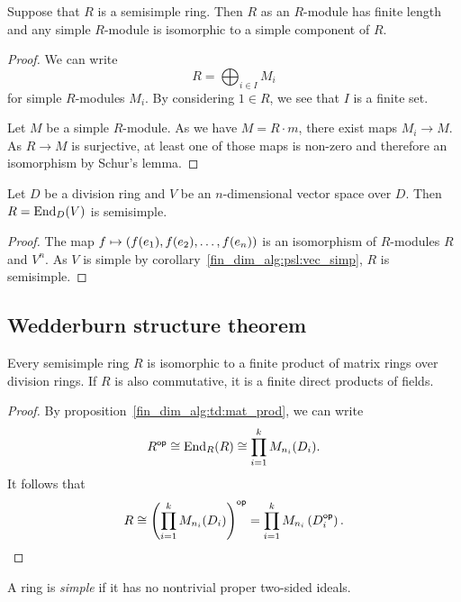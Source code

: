 \begin{posledica}
Suppose that $R$ is a semisimple ring. Then $R$ as an $R$-module
has finite length and any simple $R$-module is isomorphic to a
simple component of $R$.
\end{posledica}

\begin{proof}
We can write
\[
R = \bigoplus_{i \in I} M_i
\]
for simple $R$-modules $M_i$. By considering $1 \in R$, we see that
$I$ is a finite set.

Let $M$ be a simple $R$-module. As we have $M = R \cdot m$, there
exist maps $M_i \to M$. As $R \to M$ is surjective, at least one
of those maps is non-zero and therefore an isomorphism by Schur's
lemma.
\end{proof}

\begin{trditev}
Let $D$ be a division ring and $V$ be an $n$-dimensional vector
space over $D$. Then $R = \operatorname{End}_D(V)$ is semisimple.
\end{trditev}

\begin{proof}
The map $f \mapsto \left(f(e_1), f(e_2), \dots, f(e_n)\right)$ is an
isomorphism of $R$-modules $R$ and $V^n$. As $V$ is simple by
corollary~\ref{fin_dim_alg:psl:vec_simp}, $R$ is semisimple.
\end{proof}

\newpage

\subsection{Wedderburn structure theorem}

\begin{izrek}[Wedderburn]
Every semisimple ring $R$ is isomorphic to a finite product of
matrix rings over division rings. If $R$ is also commutative, it is
a finite direct products of fields.
\end{izrek}

\begin{proof}
By proposition~\ref{fin_dim_alg:td:mat_prod}, we can write
\[
R^{\mathsf{op}} \cong \operatorname{End}_R(R) \cong \prod_{i=1}^k M_{n_i}(D_i).
\]
It follows that
\[
R \cong
\left(\prod_{i=1}^k M_{n_i}(D_i)\right)^{\mathsf{op}} =
\prod_{i=1}^k M_{n_i} \left(D_i^{\mathsf{op}}\right). \qedhere
\]
\end{proof}


\begin{definicija}
A ring is \emph{simple} if it has no nontrivial
proper two-sided ideals.
\end{definicija}

